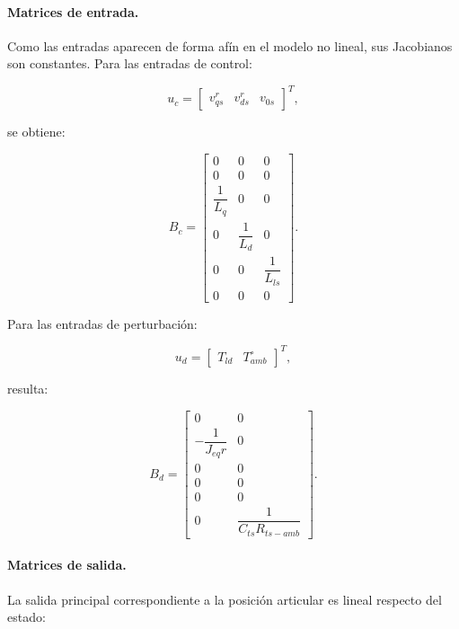 \documentclass[10pt,a4paper]{article}
\begin{document}
\paragraph{Matrices de entrada.}
Como las entradas aparecen de forma afín en el modelo no lineal, sus Jacobianos son constantes. Para las entradas de control:

\begin{equation}
	u_c=
	\begin{bmatrix}
		v_{qs}^r &
		v_{ds}^r &
		v_{0s}
	\end{bmatrix}^{T},
\end{equation}

se obtiene:

\begin{equation}
	\boxed{
		B_c=
		\begin{bmatrix}
			0 & 0 & 0\\
			0 & 0 & 0\\
			\dfrac{1}{L_q} & 0 & 0\\[2mm]
			0 & \dfrac{1}{L_d} & 0\\[2mm]
			0 & 0 & \dfrac{1}{L_{ls}}\\[2mm]
			0 & 0 & 0
		\end{bmatrix}.
	}
	\label{eq:matriz_bc_lpv_6}
\end{equation}

Para las entradas de perturbación:

\begin{equation}
	u_d=
	\begin{bmatrix}
		T_{ld} &
		T_{amb}^{\circ}
	\end{bmatrix}^{T},
\end{equation}

resulta:

\begin{equation}
	\boxed{
		B_d=
		\begin{bmatrix}
			0 & 0\\[1mm]
			-\dfrac{1}{J_{eq}r} & 0\\[2mm]
			0 & 0\\
			0 & 0\\
			0 & 0\\[1mm]
			0 & \dfrac{1}{C_{ts}R_{ts-amb}}
		\end{bmatrix}.
	}
	\label{eq:matriz_bd_lpv_6}
\end{equation}

\paragraph{Matrices de salida.}
La salida principal correspondiente a la posición articular es lineal respecto del estado:
\end{document}
